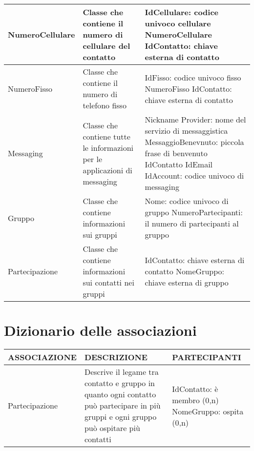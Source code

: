 \documentclass{article}
\begin{document}
\begin{tabular}{| m{3cm} | m{6cm}| m{6cm} |}
            \hline
            NumeroCellulare & Classe che contiene il numero di cellulare del contatto &
            IdCellulare: codice univoco cellulare\newline
            NumeroCellulare\newline
            IdContatto: chiave esterna di contatto\\
            \hline
            NumeroFisso & Classe che contiene il numero di telefono fisso &
            IdFisso:  codice univoco fisso\newline
            NumeroFisso\newline
            IdContatto: chiave esterna di contatto\\
            \hline
            Messaging & Classe che contiene tutte le informazioni per le applicazioni di messaging &
            Nickname\newline
            Provider: nome del servizio di messaggistica\newline
            MessaggioBenevnuto: piccola frase di benvenuto\newline
            IdContatto\newline
            IdEmail\newline
            IdAccount: codice univoco di messaging\\
            \hline
            Gruppo & Classe che contiene informazioni sui gruppi &
            Nome: codice univoco di gruppo\newline
            NumeroPartecipanti: il numero di partecipanti al gruppo\\
            \hline
            Partecipazione & Classe che contiene informazioni sui contatti nei gruppi &
            IdContatto: chiave esterna di contatto\newline
            NomeGruppo: chiave esterna di gruppo\\
            \hline
    
        \end{tabular}

    \section{\LARGE Dizionario delle associazioni}
        \begin{tabular}{| m{3cm} | m{6cm}| m{6cm} |}
            \hline
            \textbf{ASSOCIAZIONE} &\textbf{DESCRIZIONE} & \textbf{PARTECIPANTI}\\
            \hline
            Partecipazione & Descrive il legame tra contatto e gruppo in quanto ogni contatto può partecipare in più gruppi e ogni gruppo può ospitare più contatti &
            IdContatto: è membro (0,n)\newline
            NomeGruppo: ospita (0,n)\\
            \hline
        \end{tabular}
    \\ \\ \\
\end{document}
